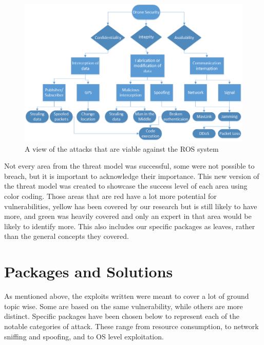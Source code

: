 \documentclass[IEEEtran,letterpaper,10pt,notitlepage,draftclsnofoot]{article}
\begin{document}
\begin{figure}[H]
    \centering
    \includegraphics[width=\textwidth]{model}
    \caption{A view of the attacks that are viable against the ROS system}
\end{figure}

Not every area from the threat model was successful, some were not possible to breach, but it is important to acknowledge their importance.
This new version of the threat model was created to showcase the success level of each area using color coding.
Those areas that are red have a lot more potential for vulnerabilities, yellow has been covered by our research but is still likely to have more, and green was heavily covered and only an expert in that area would be likely to identify more.
This also includes our specific packages as leaves, rather than the general concepts they covered.


\section{Packages and Solutions}
As mentioned above, the exploits written were meant to cover a lot of ground topic wise.
Some are based on the same vulnerability, while others are more distinct.
Specific packages have been chosen below to represent each of the notable categories of attack.
These range from resource consumption, to network sniffing and spoofing, and to OS level exploitation.
\end{document}
